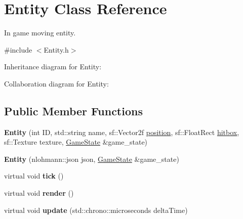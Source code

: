 \hypertarget{classEntity}{\section{Entity Class Reference}
\label{classEntity}
}


In game moving entity.  




{\ttfamily \#include $<$Entity.\-h$>$}



Inheritance diagram for Entity\-:


Collaboration diagram for Entity\-:
\subsection*{Public Member Functions}
\begin{DoxyCompactItemize}
\item 
\hypertarget{classEntity_a17f49267273ae880a6c004e2560aca02}{{\bfseries Entity} (int I\-D, std\-::string name, sf\-::\-Vector2f \hyperlink{classEntity_afc349ec89c2bffef70bf6a1d95603154}{position}, sf\-::\-Float\-Rect \hyperlink{classEntity_a3bed8137e87ee1923135c5b24207da60}{hitbox}, sf\-::\-Texture texture, \hyperlink{classGameState}{Game\-State} \&game\-\_\-state)}\label{classEntity_a17f49267273ae880a6c004e2560aca02}

\item 
\hypertarget{classEntity_af7b0405ce1a4be34d4117b6f5618dad9}{{\bfseries Entity} (nlohmann\-::json json, \hyperlink{classGameState}{Game\-State} \&game\-\_\-state)}\label{classEntity_af7b0405ce1a4be34d4117b6f5618dad9}

\item 
\hypertarget{classEntity_a2f08fe2d5e636d5d3bd17652c2e4eb53}{virtual void {\bfseries tick} ()}\label{classEntity_a2f08fe2d5e636d5d3bd17652c2e4eb53}

\item 
\hypertarget{classEntity_af5ca41372ff108e4c044e8d927995a27}{virtual void {\bfseries render} ()}\label{classEntity_af5ca41372ff108e4c044e8d927995a27}

\item 
\hypertarget{classEntity_a06f9fd4c95bcf72cd3ffef5b18218f76}{virtual void {\bfseries update} (std\-::chrono\-::microseconds delta\-Time)}\label{classEntity_a06f9fd4c95bcf72cd3ffef5b18218f76}

\end{DoxyCompactItemize}
